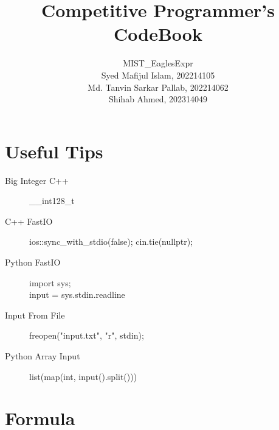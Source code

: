 \documentclass[10pt, a4paper]{article}
\title{Competitive Programmer’s CodeBook}
\author{MIST\_EaglesExpr\\[2cm] Syed Mafijul Islam, 202214105\\
Md. Tanvin Sarkar Pallab, 202214062\\
Shihab Ahmed, 202314049
}
\begin{document}
\maketitle
\thispagestyle{empty}

\newpage
\tableofcontents
\newpage

\begin{multicols}{2}

\section{Useful Tips}
\begin{description}
    \item[Big Integer C++] \_\_int128\_t
    \item[C++ FastIO] \hfill \break
    ios::sync\_with\_stdio(false);
    cin.tie(nullptr);
    \item[Python FastIO] \hfill \break
    import sys; \\
    input = sys.stdin.readline
    \item[Input From File] \hfill \break
    freopen("input.txt", "r", stdin);
    \item[Python Array Input] \hfill \break
    list(map(int, input().split()))
\end{description}

\section{Formula}

\end{multicols}
\end{document}
